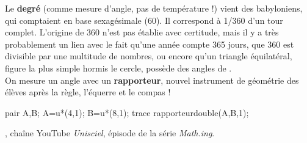 \vspace*{-8mm}

\vspace*{-5mm}
\begin{debat}
    Le {\bf degré} (comme mesure d'angle, pas de température !) vient des babyloniens, qui comptaient en base sexagésimale (60). Il correspond à 1/360 d'un tour complet. L'origine de 360 n'est pas établie avec certitude, mais il y a très probablement un lien avec le fait qu'une année compte 365 jours, que 360 est divisible par une multitude de nombres, ou encore qu'un triangle équilatéral, figure la plus simple hormis le cercle, possède des angles de . \\
    On mesure un angle avec un {\bf rapporteur}, nouvel instrument de géométrie des élèves après la règle, l'équerre et le compas !
    \begin{center} 
       \begin{Geometrie}
        pair A,B;
        A=u*(4,1);
        B=u*(8,1);
        trace rapporteurdouble(A,B,1);
       \end{Geometrie}
    \end{center}
    \bigskip
    \begin{cadre}[B2][F4]
       \begin{center}
          , chaîne YouTube {\it Unisciel}, épisode de la série {\it Math.ing}.
       \end{center}
    \end{cadre}
\end{debat}